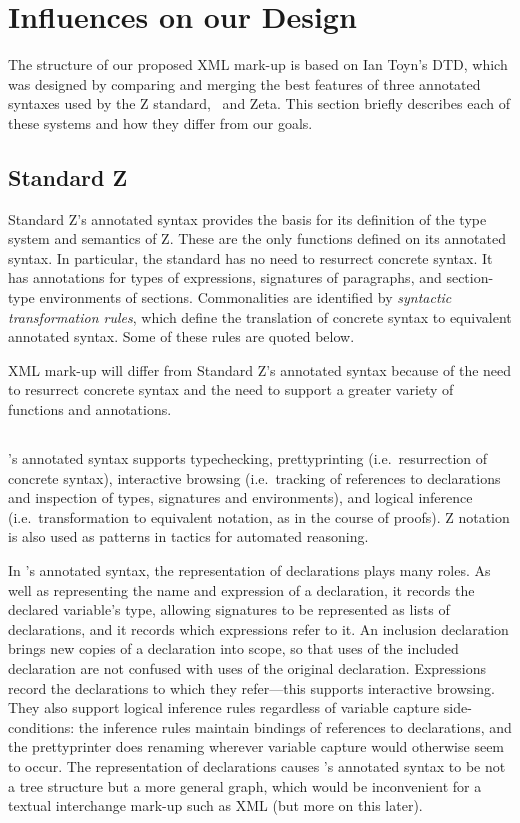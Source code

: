 \documentclass{llncs}  %
\newcommand{\Zeta}{Zeta}
\begin{document}
\section{Influences on our Design}

The structure of our proposed XML mark-up is based on Ian Toyn's DTD,
which was designed by comparing and merging the best features
of three annotated syntaxes used by the Z standard, \CADiZ\ and \Zeta.
This section briefly describes each of these systems and how they
differ from our goals.

\subsection{Standard Z}

Standard Z's annotated syntax provides the basis for its definition
of the type system and semantics of Z.
These are the only functions defined on its annotated syntax.
In particular, the standard has no need to resurrect concrete syntax.
It has annotations for types of expressions,
signatures of paragraphs, and section-type environments of sections.
Commonalities are identified by \textit{syntactic transformation rules},
which define the translation of concrete syntax to equivalent annotated syntax.
Some of these rules are quoted below.

XML mark-up will differ from Standard Z's annotated syntax
because of the need to resurrect concrete syntax
and the need to support a greater variety of functions and annotations.

\subsection{\CADiZ}

\CADiZ's annotated syntax supports typechecking,
prettyprinting (i.e.\ resurrection of concrete syntax),
interactive browsing (i.e.\ tracking of references to declarations
and inspection of types, signatures and environments),
and logical inference (i.e.\ transformation to equivalent notation,
as in the course of proofs).
Z notation is also used as patterns in tactics for automated reasoning.

In \CADiZ's annotated syntax,
the representation of declarations plays many roles.
As well as representing the name and expression of a declaration,
it records the declared variable's type,
allowing signatures to be represented as lists of declarations,
and it records which expressions refer to it.
An inclusion declaration brings new copies of a declaration into scope,
so that uses of the included declaration are not
confused with uses of the original declaration.
Expressions record the declarations to which they refer---this
supports interactive browsing.
They also support logical inference rules
regardless of variable capture side-conditions:
the inference rules maintain bindings of references to declarations,
and the prettyprinter does renaming
wherever variable capture would otherwise seem to occur.
The representation of declarations causes \CADiZ's annotated syntax
to be not a tree structure but a more general graph,
which would be inconvenient for a textual interchange mark-up such as XML
(but more on this later).
\end{document}
